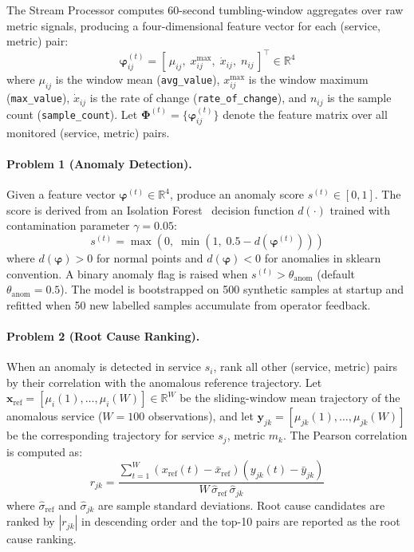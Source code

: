 \documentclass[a4paper,anonymous,UKenglish]{lipics-v2021}
\begin{document}
The Stream Processor computes 60-second tumbling-window aggregates over raw
metric signals, producing a four-dimensional feature vector for each
(service, metric) pair:
\begin{equation}
    \boldsymbol{\varphi}^{(t)}_{ij} =
    [\,\mu_{ij},\; x^{\max}_{ij},\; \dot{x}_{ij},\; n_{ij}\,]^\top \in \mathbb{R}^4
    \label{eq:features}
\end{equation}
where $\mu_{ij}$ is the window mean (\texttt{avg\_value}), $x^{\max}_{ij}$ is
the window maximum (\texttt{max\_value}), $\dot{x}_{ij}$ is the rate of change
(\texttt{rate\_of\_change}), and $n_{ij}$ is the sample count
(\texttt{sample\_count}). Let $\boldsymbol{\Phi}^{(t)} =
\{\boldsymbol{\varphi}^{(t)}_{ij}\}$ denote the feature matrix over all
monitored (service, metric) pairs.

\paragraph*{Problem 1 (Anomaly Detection).}
Given a feature vector $\boldsymbol{\varphi}^{(t)} \in \mathbb{R}^4$, produce
an anomaly score $s^{(t)} \in [0,1]$. The score is derived from an Isolation
Forest~\cite{liu2012isolation} decision function $d(\cdot)$ trained with
contamination parameter $\gamma{=}0.05$:
\begin{equation}
    s^{(t)} = \max\!\left(0,\;\min\!\left(1,\;0.5 -
    d\!\left(\boldsymbol{\varphi}^{(t)}\right)\right)\right)
    \label{eq:anomaly}
\end{equation}
where $d(\boldsymbol{\varphi}) > 0$ for normal points and
$d(\boldsymbol{\varphi}) < 0$ for anomalies in sklearn~\cite{sklearn2011}
convention. A binary anomaly flag is raised when
$s^{(t)} > \theta_{\text{anom}}$ (default $\theta_{\text{anom}} = 0.5$). The
model is bootstrapped on 500 synthetic samples at startup and refitted when 50
new labelled samples accumulate from operator feedback.

\paragraph*{Problem 2 (Root Cause Ranking).}
When an anomaly is detected in service $s_i$, rank all other (service, metric)
pairs by their correlation with the anomalous reference trajectory. Let
$\mathbf{x}_{\text{ref}} = [\mu_{i}(1), \ldots, \mu_{i}(W)] \in \mathbb{R}^W$
be the sliding-window mean trajectory of the anomalous service ($W{=}100$
observations), and let $\mathbf{y}_{jk} = [\mu_{jk}(1), \ldots, \mu_{jk}(W)]$
be the corresponding trajectory for service $s_j$, metric $m_k$. The Pearson
correlation is computed as:
\begin{equation}
    r_{jk} = \frac{\displaystyle\sum_{t=1}^{W}\!\left(x_{\text{ref}}(t) -
    \bar{x}_{\text{ref}}\right)\!\left(y_{jk}(t) - \bar{y}_{jk}\right)}
    {W\,\hat{\sigma}_{\text{ref}}\,\hat{\sigma}_{jk}}
    \label{eq:rca}
\end{equation}
where $\hat{\sigma}_{\text{ref}}$ and $\hat{\sigma}_{jk}$ are sample standard
deviations. Root cause candidates are ranked by $|r_{jk}|$ in descending order
and the top-10 pairs are reported as the root cause ranking.
\end{document}
